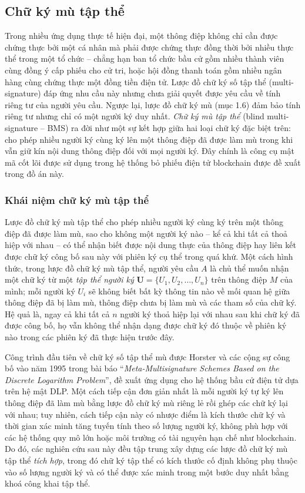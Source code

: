 \subsection{Chữ ký mù tập thể}
\label{sec:chu-ky-mu-tap-the}

Trong nhiều ứng dụng thực tế hiện đại, một thông điệp không chỉ cần được chứng thực bởi một cá nhân mà phải được chứng thực đồng thời bởi nhiều thực thể trong một tổ chức -- chẳng hạn ban tổ chức bầu cử gồm nhiều thành viên cùng đồng ý cấp phiếu cho cử tri, hoặc hội đồng thanh toán gồm nhiều ngân hàng cùng chứng thực một đồng tiền điện tử. Lược đồ chữ ký số tập thể (multi-signature) đáp ứng nhu cầu này nhưng chưa giải quyết được yêu cầu về tính riêng tư của người yêu cầu. Ngược lại, lược đồ chữ ký mù (mục 1.6) đảm bảo tính riêng tư nhưng chỉ có một người ký duy nhất. \textit{Chữ ký mù tập thể} (blind multi-signature -- BMS) ra đời như một sự kết hợp giữa hai loại chữ ký đặc biệt trên: cho phép nhiều người ký cùng ký lên một thông điệp đã được làm mù trong khi vẫn giữ kín nội dung thông điệp đối với mọi người ký. Đây chính là công cụ mật mã cốt lõi được sử dụng trong hệ thống bỏ phiếu điện tử blockchain được đề xuất trong đồ án này.

\subsubsection{Khái niệm chữ ký mù tập thể}

Lược đồ chữ ký mù tập thể cho phép nhiều người ký cùng ký trên một thông điệp đã được làm mù, sao cho không một người ký nào -- kể cả khi tất cả thoả hiệp với nhau -- có thể nhận biết được nội dung thực của thông điệp hay liên kết được chữ ký công bố sau này với phiên ký cụ thể trong quá khứ. Một cách hình thức, trong lược đồ chữ ký mù tập thể, người yêu cầu $A$ là chủ thể muốn nhận một chữ ký từ một \textit{tập thể người ký} $\mathbf{U} = \{U_1, U_2, \ldots, U_n\}$ trên thông điệp $M$ của mình; mỗi người ký $U_i$ sẽ không biết bất kỳ thông tin nào về mối quan hệ giữa thông điệp đã bị làm mù, thông điệp chưa bị làm mù và các tham số của chữ ký. Hệ quả là, ngay cả khi tất cả $n$ người ký thoả hiệp lại với nhau sau khi chữ ký đã được công bố, họ vẫn không thể nhận dạng được chữ ký đó thuộc về phiên ký nào trong các phiên ký đã thực hiện trước đây.

Công trình đầu tiên về chữ ký số tập thể mù được Horster và các cộng sự công bố vào năm 1995 trong bài báo ``\textit{Meta-Multisignature Schemes Based on the Discrete Logarithm Problem}'', đề xuất ứng dụng cho hệ thống bầu cử điện tử dựa trên hệ mật DLP. Một cách tiếp cận đơn giản nhất là mỗi người ký tự ký lên thông điệp đã làm mù bằng lược đồ chữ ký mù riêng lẻ rồi ghép các chữ ký lại với nhau; tuy nhiên, cách tiếp cận này có nhược điểm là kích thước chữ ký và thời gian xác minh tăng tuyến tính theo số lượng người ký, không phù hợp với các hệ thống quy mô lớn hoặc môi trường có tài nguyên hạn chế như blockchain. Do đó, các nghiên cứu sau này đều tập trung xây dựng các lược đồ chữ ký mù tập thể \textit{tích hợp}, trong đó chữ ký tập thể có kích thước cố định không phụ thuộc vào số lượng người ký và có thể được xác minh trong một bước duy nhất bằng khoá công khai tập thể.


